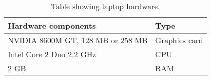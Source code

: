 \begin{table}[h]
\centering
\begin{tabular}{ l l }
Hardware components                                & Type             \\
\hline
NVIDIA 8600M GT, 128 MB or 258 MB                  & Graphics card    \\
Intel Core 2 Duo 2.2 GHz                           & CPU              \\
2 GB                                               & RAM              \\
\hline
\end{tabular}
\caption{Table showing laptop hardware.}
\label{tab:laptop-hardware}
\end{table}
